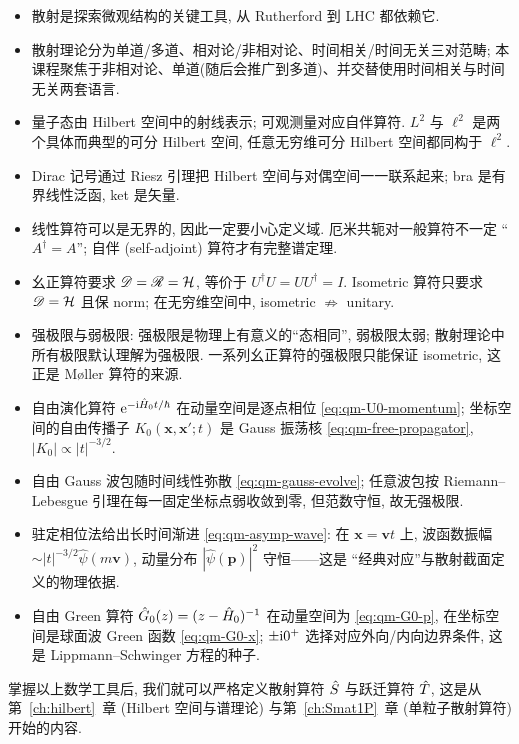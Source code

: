 \begin{itemize}
    \item 散射是探索微观结构的关键工具, 从 Rutherford 到 LHC 都依赖它.
    \item 散射理论分为单道/多道、相对论/非相对论、时间相关/时间无关三对范畴; 本课程聚焦于非相对论、单道(随后会推广到多道)、并交替使用时间相关与时间无关两套语言.
    \item 量子态由 Hilbert 空间中的射线表示; 可观测量对应自伴算符. $L^{2}$ 与 $\ell^{2}$ 是两个具体而典型的可分 Hilbert 空间, 任意无穷维可分 Hilbert 空间都同构于 $\ell^{2}$.
    \item Dirac 记号通过 Riesz 引理把 Hilbert 空间与对偶空间一一联系起来; bra 是有界线性泛函, ket 是矢量.
    \item 线性算符可以是无界的, 因此一定要小心定义域. 厄米共轭对一般算符不一定 ``$A^{\dagger}=A$''; 自伴 (self-adjoint) 算符才有完整谱定理.
    \item 幺正算符要求 $\mathscr D=\mathscr R=\mathcal{H}$, 等价于 $U^{\dagger}U=UU^{\dagger}=I$. Isometric 算符只要求 $\mathscr D=\mathcal{H}$ 且保 norm; 在无穷维空间中, isometric $\not\Rightarrow$ unitary.
    \item 强极限与弱极限: 强极限是物理上有意义的``态相同'', 弱极限太弱; 散射理论中所有极限默认理解为强极限. 一系列幺正算符的强极限只能保证 isometric, 这正是 M\o ller 算符的来源.
    \item 自由演化算符 $\mathrm{e}^{-\mathrm{i}\hat{H}_0 t/\hbar}$ 在动量空间是逐点相位 \eqref{eq:qm-U0-momentum}; 坐标空间的自由传播子 $K_{0}(\mathbf x,\mathbf x';t)$ 是 Gauss 振荡核 \eqref{eq:qm-free-propagator}, $|K_{0}|\propto|t|^{-3/2}$.
    \item 自由 Gauss 波包随时间线性弥散 \eqref{eq:qm-gauss-evolve}; 任意波包按 Riemann--Lebesgue 引理在每一固定坐标点弱收敛到零, 但范数守恒, 故无强极限.
    \item 驻定相位法给出长时间渐进 \eqref{eq:qm-asymp-wave}: 在 $\mathbf x=\mathbf v t$ 上, 波函数振幅 $\sim|t|^{-3/2}\hat\psi(m\mathbf v)$, 动量分布 $|\hat\psi(\mathbf p)|^{2}$ 守恒——这是 ``经典对应''与散射截面定义的物理依据.
    \item 自由 Green 算符 $\hat{G}_{0}(z)=(z-\hat{H}_{0})^{-1}$ 在动量空间为 \eqref{eq:qm-G0-p}, 在坐标空间是球面波 Green 函数 \eqref{eq:qm-G0-x}; $\pm\mathrm{i} 0^{+}$ 选择对应外向/内向边界条件, 这是 Lippmann--Schwinger 方程的种子.
\end{itemize}

掌握以上数学工具后, 我们就可以严格定义散射算符 $\hat{S}$ 与跃迁算符 $\hat{T}$, 这是从第~\ref{ch:hilbert}~章 (Hilbert 空间与谱理论) 与第~\ref{ch:Smat1P}~章 (单粒子散射算符) 开始的内容.
